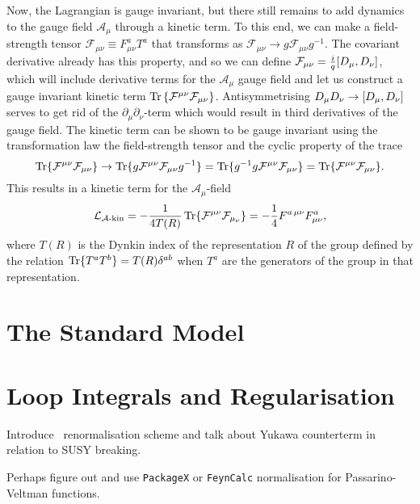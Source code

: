 \documentclass[../main.tex]{subfiles}
\begin{document}
Now, the Lagrangian is gauge invariant, but there still remains to add dynamics
to the gauge field \(\mathcal{A}_\mu\) through a kinetic term.
To this end, we can make a field-strength tensor \(\mathcal{F}_{\mu\nu} \equiv
F_{\mu\nu}^a T^a\) that transforms as \(\mathcal{F}_{\mu\nu} \to g
\mathcal{F}_{\mu\nu} g^{-1}\).
The covariant derivative already has this property, and so we can define
\(\mathcal{F}_{\mu\nu} = \frac{i}{q} [D_\mu,D_\nu]\), which will include
derivative terms for the \(\mathcal{A}_\mu\) gauge field and let us construct a
gauge invariant kinetic term \(\operatorname{Tr}\left\{\mathcal{F}^{\mu\nu} \mathcal{F}_{\mu\nu}\right\}\).
Antisymmetrising \(D_\mu D_\nu \to [D_\mu,D_\nu]\) serves to get rid of the \(\partial_\mu \partial_\nu\)-term which would result in third derivatives of the gauge field.
The kinetic term can be shown to be gauge invariant using the transformation law the field-strength tensor and the cyclic property of the trace
\begin{equation}
  \operatorname{Tr}\{\mathcal{F}^{\mu\nu} \mathcal{F}_{\mu\nu}\} \to
  \operatorname{Tr}\{g \mathcal{F}^{\mu\nu} \mathcal{F}_{\mu\nu} g^{-1}\} =
  \operatorname{Tr}\{g^{-1} g \mathcal{F}^{\mu\nu} \mathcal{F}_{\mu\nu}\} =
  \operatorname{Tr}\{\mathcal{F}^{\mu\nu} \mathcal{F}_{\mu\nu}\}.
\end{equation}
This results in a kinetic term for the \(\mathcal{A}_\mu\)-field
\begin{equation}
  \label{qft:eq:Akin}
  \mathcal{L}_{\mathcal{A}\text{-kin}} = -\frac{1}{4T(R)} \operatorname{Tr}\{\mathcal{F}^{\mu\nu} \mathcal{F}_{\mu_\nu}\} = -\frac{1}{4} F^{a\,\mu\nu} F^a_{\mu\nu},
\end{equation}
where \(T(R)\) is the Dynkin index of the representation \(R\) of the group defined by the relation \(\operatorname{Tr}\{T^a T^b\} = T(R) \delta^{ab}\) when \(T^a\) are the generators of the group in that representation.




\section{The Standard Model}




\section{Loop Integrals and Regularisation}
\begin{TODO}
  \item Introduce \DRbar\ renormalisation scheme and talk about Yukawa counterterm in relation to SUSY breaking.
  \item Perhaps figure out and use \verb|PackageX| or \verb|FeynCalc| normalisation for Passarino-Veltman functions.
\end{TODO}
\end{document}
